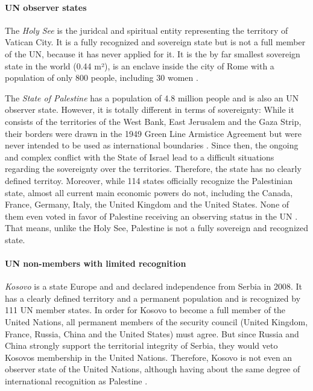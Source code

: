 \paragraph{UN observer states} %
\label{par:un_observer_states}

The \emph{Holy See} is the juridcal and spiritual entity representing the territory of Vatican City. It is a fully recognized and sovereign state but is not a full member of the UN, because it has never applied for it. It is the by far smallest sovereign state in the world (0.44 m²), is an enclave inside the city of Rome with a population of only 800 people, including 30 women \cite{VaticanPopulation}.

The \emph{State of Palestine} has a population of 4.8 million people \cite[as of 2016]{PalestinePopulation} and is also an UN observer state. However, it is totally different in terms of sovereignty: While it consists of the territories of the West Bank, East Jerusalem and the Gaza Strip, their borders were drawn in the 1949 Green Line Armistice Agreement but were never intended to be used as international boundaries \cite{PalestineTerritory}. Since then, the ongoing and complex conflict with the State of Israel lead to a difficult situations regarding the sovereignty over the territories. Therefore, the state has no clearly defined territoy. Moreover, while 114 states officially recognize the Palestinian state, almost all current main economic powers do not, including the Canada, France, Germany, Italy, the United Kingdom and the United States. None of them even voted in favor of Palestine receiving an observing status in the UN \cite{PalestineUN}. That means, unlike the Holy See, Palestine is not a fully sovereign and recognized state.


\paragraph{UN non-members with limited recognition} %
\label{par:un_non_members_with_limited_recognition}

\emph{Kosovo} is a state Europe and and declared independence from Serbia in 2008. It has a clearly defined territory and a permanent population and is recognized by 111 UN member states. In order for Kosovo to become a full member of the United Nations, all permanent members of the security council (United Kingdom, France, Russia, China and the United States) must agree. But since Russia and China strongly support the territorial integrity of Serbia, they would veto Kosovos membership in the United Nations. Therefore, Kosovo is not even an observer state of the United Nations, although having about the same degree of international recognition as Palestine \cite{KosovoThanksYou}.

